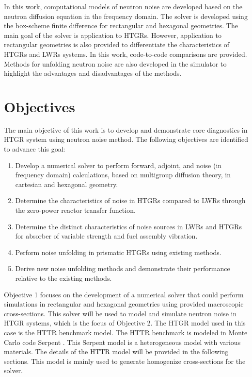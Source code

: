 In this work, computational models of neutron noise are developed based on the neutron diffusion equation in the frequency domain. The solver is developed using the box-scheme finite difference for rectangular and hexagonal geometries. The main goal of the solver is application to \glspl*{HTGR}. However, application to rectangular geometries is also provided to differentiate the characteristics of \glspl*{HTGR} and \glspl*{LWR} systems. In this work, code-to-code comparisons are provided. Methods for unfolding neutron noise are also developed in the simulator to highlight the advantages and disadvantages of the methods. 

\section{Objectives}

The main objective of this work is to develop and demonstrate core diagnostics in HTGR system using neutron noise method. The following objectives are identified to advance this goal:
\begin{enumerate}
    \item Develop a numerical solver to perform forward, adjoint, and noise (in frequency domain) calculations, based on multigroup diffusion theory, in cartesian and hexagonal geometry.
    \item Determine the characteristics of noise in HTGRs compared to LWRs through the zero-power reactor transfer function.
    \item Determine the distinct characteristics of noise sources in LWRs and HTGRs for absorber of variable strength and fuel assembly vibration.
    \item Perform noise unfolding in prismatic HTGRs using existing methods.
    \item Derive new noise unfolding methods and demonstrate their performance relative to the existing methods.
\end{enumerate}

Objective 1 focuses on the development of a numerical solver that could perform simulations in rectangular and hexagonal geometries using provided macroscopic cross-sections. This solver will be used to model and simulate neutron noise in HTGR systems, which is the focus of Objective 2. The HTGR model used in this case is the HTTR benchmark model. The HTTR benchmark is modeled in Monte Carlo code Serpent \cite{leppanenSerpentMonteCarlo2015}. This Serpent model is a heterogeneous model with various materials. The details of the HTTR model will be provided in the following sections. This model is mainly used to generate homogenize cross-sections for the solver. 

